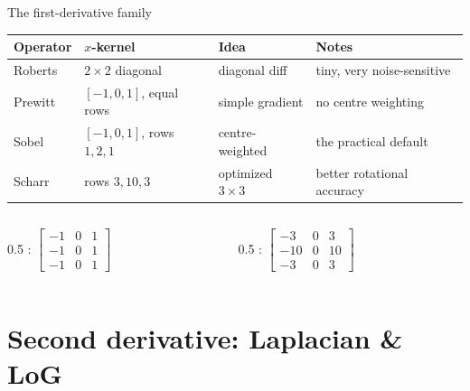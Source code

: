 \documentclass[10pt,aspectratio=169]{beamer}
\begin{document}
\begin{frame}{The first-derivative family}
  \begin{center}
  \begin{tabular}{@{}llll@{}}
    \toprule
    \textbf{Operator} & \textbf{$x$-kernel} & \textbf{Idea} & \textbf{Notes} \\
    \midrule
    Roberts & $2{\times}2$ diagonal & diagonal diff & tiny, very noise-sensitive \\
    Prewitt & $[-1,0,1]$, equal rows & simple gradient & no centre weighting \\
    Sobel   & $[-1,0,1]$, rows $1,2,1$ & centre-weighted & the practical default \\
    Scharr  & rows $3,10,3$ & optimized $3{\times}3$ & better rotational accuracy \\
    \bottomrule
  \end{tabular}
  \end{center}
  \begin{columns}[T]
    \begin{column}{0.5\textwidth}
      : $\begin{bmatrix}-1&0&1\\-1&0&1\\-1&0&1\end{bmatrix}$
    \end{column}
    \begin{column}{0.5\textwidth}
      : $\begin{bmatrix}-3&0&3\\-10&0&10\\-3&0&3\end{bmatrix}$
    \end{column}
  \end{columns}
  \vspace{2pt}
\end{frame}

\section{Second derivative: Laplacian \& LoG}
\end{document}
